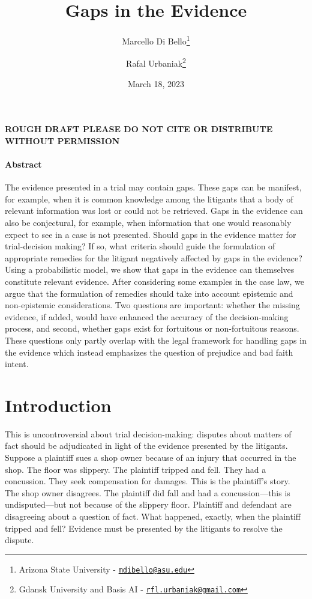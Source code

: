 \documentclass[
  10pt,
  dvipsnames,enabledeprecatedfontcommands]{scrartcl}
\title{Gaps in the Evidence}
\author{Marcello Di Bello\footnote{Arizona State University -
  \href{mailto:mdibello@asu.edu}{\nolinkurl{mdibello@asu.edu}}} \and Rafal
Urbaniak\footnote{Gdansk University and Basis AI -
  \href{mailto:rfl.urbaniak@gmail.com}{\nolinkurl{rfl.urbaniak@gmail.com}}}}
\date{March 18, 2023}
\begin{document}
\maketitle

\textbf{ROUGH DRAFT PLEASE DO NOT CITE OR DISTRIBUTE WITHOUT PERMISSION}

\paragraph*{Abstract}

The evidence presented in a trial may contain gaps. These gaps can be
manifest, for example, when it is common knowledge among the litigants
that a body of relevant information was lost or could not be retrieved.
Gaps in the evidence can also be conjectural, for example, when
information that one would reasonably expect to see in a case is not
presented. Should gaps in the evidence matter for trial-decision making?
If so, what criteria should guide the formulation of appropriate
remedies for the litigant negatively affected by gaps in the evidence?
Using a probabilistic model, we show that gaps in the evidence can
themselves constitute relevant evidence. After considering some examples
in the case law, we argue that the formulation of remedies should take
into account epistemic and non-epistemic considerations. Two questions
are important: whether the missing evidence, if added, would have
enhanced the accuracy of the decision-making process, and second,
whether gaps exist for fortuitous or non-fortuitous reasons. These
questions only partly overlap with the legal framework for handling gaps
in the evidence which instead emphasizes the question of prejudice and
bad faith intent.

\tableofcontents

\hypertarget{introduction}{%
\section{Introduction}\label{introduction}}

This is uncontroversial about trial decision-making: disputes about
matters of fact should be adjudicated in light of the evidence presented
by the litigants. Suppose a plaintiff sues a shop owner because of an
injury that occurred in the shop. The floor was slippery. The plaintiff
tripped and fell. They had a concussion. They seek compensation for
damages. This is the plaintiff's story. The shop owner disagrees. The
plaintiff did fall and had a concussion---this is undisputed---but not
because of the slippery floor. Plaintiff and defendant are disagreeing
about a question of fact. What happened, exactly, when the plaintiff
tripped and fell? Evidence must be presented by the litigants to resolve
the dispute.
\end{document}
